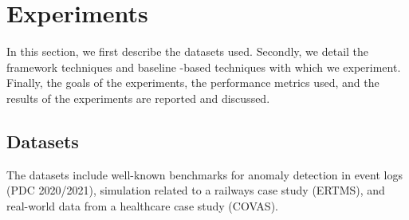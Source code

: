 \section{Experiments}
\label{sec:evaluation}
In this section, we first describe the datasets used. Secondly, we detail the framework techniques and baseline -based techniques with which we experiment. Finally, the goals of the experiments, the performance metrics used, and the results of the experiments are reported and discussed.

\subsection{Datasets}
The datasets include well-known benchmarks for anomaly detection in event logs (PDC 2020/2021), simulation related to a railways case study (ERTMS), and real-world data from a healthcare case study (COVAS).

